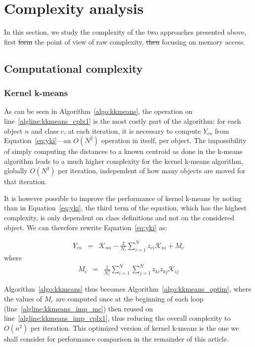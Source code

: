 \documentclass[natbib,smallextended]{svjour3}
\newcommand{\cad}{---} %
\providecommand{\DIFaddtex}[1]{{\protect\color{blue}\uwave{#1}}} %
\providecommand{\DIFdeltex}[1]{{\protect\color{red}\sout{#1}}}                      %
\providecommand{\DIFaddbegin}{} %
\providecommand{\DIFaddend}{} %
\providecommand{\DIFdelbegin}{} %
\providecommand{\DIFdelend}{} %
\providecommand{\DIFadd}[1]{\texorpdfstring{\DIFaddtex{#1}}{#1}} %
\providecommand{\DIFdel}[1]{\texorpdfstring{\DIFdeltex{#1}}{}} %
\newcommand{\DIFscaledelfig}{0.5}
\newlength{\DIFdelgraphicswidth} %
\newlength{\DIFdelgraphicsheight} %
\newcommand{\DIFaddincludegraphics}[2][]{{\color{blue}\fbox{\DIFOincludegraphics[#1]{#2}}}} %
\newcommand{\DIFdelincludegraphics}[2][]{%
\sbox{\DIFdelgraphicsbox}{\DIFOincludegraphics[#1]{#2}}%
\settoboxwidth{\DIFdelgraphicswidth}{\DIFdelgraphicsbox} %
\settoboxtotalheight{\DIFdelgraphicsheight}{\DIFdelgraphicsbox} %
\scalebox{\DIFscaledelfig}{%
\parbox[b]{\DIFdelgraphicswidth}{\usebox{\DIFdelgraphicsbox}\\[-\baselineskip] \rule{\DIFdelgraphicswidth}{0em}}\llap{\resizebox{\DIFdelgraphicswidth}{\DIFdelgraphicsheight}{%
\setlength{\unitlength}{\DIFdelgraphicswidth}%
\begin{picture}(1,1)%
\thicklines\linethickness{2pt} %
{\color[rgb]{1,0,0}\put(0,0){\framebox(1,1){}}}%
{\color[rgb]{1,0,0}\put(0,0){\line( 1,1){1}}}%
{\color[rgb]{1,0,0}\put(0,1){\line(1,-1){1}}}%
\end{picture}%
}\hspace*{3pt}}} %
} %
\DeclareRobustCommand{\DIFaddbegin}{\DIFOaddbegin \let\includegraphics\DIFaddincludegraphics} %
\DeclareRobustCommand{\DIFaddend}{\DIFOaddend \let\includegraphics\DIFOincludegraphics} %
\DeclareRobustCommand{\DIFdelbegin}{\DIFOdelbegin \let\includegraphics\DIFdelincludegraphics} %
\DeclareRobustCommand{\DIFdelend}{\DIFOaddend \let\includegraphics\DIFOincludegraphics} %
\begin{document}
\section{Complexity analysis}
\label{sec:complexity}

In this section, we study the complexity of the two approaches presented above, first \DIFdelbegin \DIFdel{form }\DIFdelend \DIFaddbegin \DIFadd{from }\DIFaddend the point of view of raw complexity, \DIFdelbegin \DIFdel{then }\DIFdelend \DIFaddbegin \DIFadd{second by }\DIFaddend focusing on memory access.

\subsection{Computational complexity}

\subsubsection{Kernel k-means}

As can be seen in Algorithm~\ref{algo:kkmeans}, the operation on line~\ref{algline:kkmeans_cplx1} is the most costly part of the algorithm: for each object $n$ and class $c$, at each iteration, it is necessary to compute $Y_{cn}$ from Equation~\ref{eq:yki}\cad{}an $O(N^2)$ operation in itself, per object. The impossibility of simply computing the distances to a known centroid as done in the k-means algorithm leads to a much higher complexity for the kernel k-means algorithm, globally $O(N^3)$ per iteration, independent of how many objects are moved for that iteration.

It is however possible to improve the performance of kernel k-means by noting than in Equation~\ref{eq:yki}, the third term of the equation, which has the highest complexity, is only dependent on class definitions and not on the considered object. We can therefore rewrite Equation~\ref{eq:yki} as:

\begin{eqnarray}
Y_{cn} & = & \mathcal{K}_{nn} - \frac{2}{N_c} \sum_{i=1}^{N} z_{ci} \mathcal{K}_{ni} + M_c \label{eq:yki_improved}
\end{eqnarray}
where
\begin{eqnarray}
M_c    & = & \frac{1}{N_c^2} \sum_{i=1}^{N} \sum_{j=1}^{N} z_{ki} z_{kj} \mathcal{K}_{ij} \label{eq:mc}
\end{eqnarray}

Algorithm~\ref{algo:kkmeans} thus becomes Algorithm~\ref{algo:kkmeans_optim}, where the values of $M_c$ are computed once at the beginning of each loop (line~\ref{algline:kkmeans_imp_mc}) then reused on line~\ref{algline:kkmeans_imp_cplx1}, thus reducing the overall complexity to $O(n^2)$ per iteration. This optimized version of kernel k-means is the one we shall consider for performance comparison in the remainder of this article.
\end{document}
